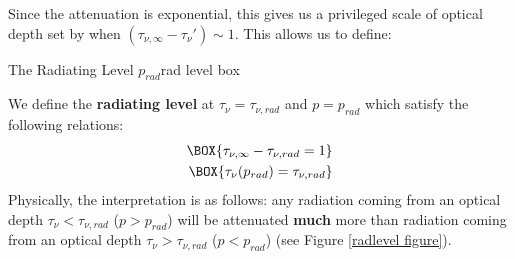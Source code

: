 Since the attenuation is exponential, this gives us a privileged scale of optical depth set by when $(\tau_{\nu,\infty}-\tau_\nu')\sim 1$. This allows us to define:
\begin{fact}{The Radiating Level $p_{rad}$}{rad level box}\label{rad level box}

    \begin{minipage}{.5\linewidth}
    We define the \textbf{radiating level} at $\tau_\nu=\tau_{\nu,rad}$ and $p=p_{rad}$ which satisfy the following relations:
    \begin{align}
        \BOX{\tau_{\nu,\infty}-\tau_{\nu,rad} = 1}\\
        \BOX{\tau_\nu(p_{rad})=\tau_{\nu,rad}}
    \end{align}
    Physically, the interpretation is as follows: any radiation coming from an optical depth $\tau_\nu<\tau_{\nu,rad}$ ($p>p_{rad}$) will be attenuated \textbf{much} more than radiation coming from an optical depth $\tau_\nu>\tau_{\nu,rad}$ ($p<p_{rad}$) (see Figure \ref{radlevel figure}).


\end{minipage}
\end{fact}
